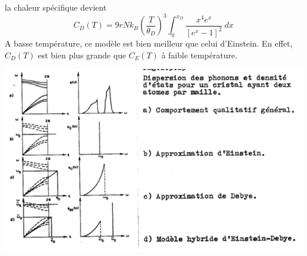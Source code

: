 	la chaleur spécifique devient
	\begin{equation}
	C_D(T) = 9rNk_B\left(\dfrac{T}{\theta_D}\right)^3\int_0^{x_D}\dfrac{x^4e^x}{
	\left[e^x-1\right]^2}\ dx
	\end{equation}
	A basse température, ce modèle est bien meilleur que celui d'Einstein. En effet, 
	$C_D(T)$ est bien plus grande que $C_E(T)$ à faible température.
	\begin{center}
	\includegraphics[scale=0.5]{ch7/image4.png}
	\end{center}






















